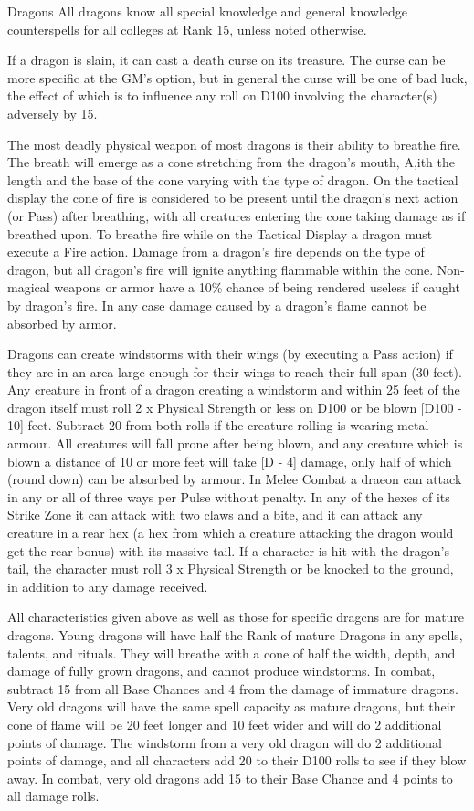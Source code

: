 \begin{mmgroup}{Dragons}
All dragons know all special knowledge and general knowledge
counterspells for all colleges at Rank 15, unless noted otherwise.

If a dragon is slain, it can cast a death curse on its treasure.  The
curse can be more specific at the GM's option, but in general the
curse will be one of bad luck, the effect of which is to influence any
roll on D100 involving the character(s) adversely by 15.

The most deadly physical weapon of most dragons is their ability to
breathe fire. The breath will emerge as a cone stretching from the
dragon's mouth, A,ith the length and the base of the cone varying with
the type of dragon.  On the tactical display the cone of fire is
considered to be present until the dragon's next action (or Pass)
after breathing, with all creatures entering the cone taking damage as
if breathed upon.  To breathe fire while on the Tactical Display a
dragon must execute a Fire action.  Damage from a dragon's fire
depends on the type of dragon, but all dragon's fire will ignite
anything flammable within the cone.  Non-magical weapons or armor have
a 10\% chance of being rendered useless if caught by dragon's fire.  In
any case damage caused by a dragon's flame cannot be absorbed by
armor.

Dragons can create windstorms with their wings (by executing a Pass
action) if they are in an area large enough for their wings to reach
their full span (30 feet).  Any creature in front of a dragon creating
a windstorm and within 25 feet of the dragon itself must roll 2 x
Physical Strength or less on D100 or be blown [D100 - 10] feet.
Subtract 20 from both rolls if the creature rolling is wearing metal
armour.  All creatures will fall prone after being blown, and any
creature which is blown a distance of 10 or more feet will take [D -
4] damage, only half of which (round down) can be absorbed by armour.
In Melee Combat a draeon can attack in any or all of three ways per
Pulse without penalty.  In any of the hexes of its Strike Zone it can
attack with two claws and a bite, and it can attack any creature in a
rear hex (a hex from which a creature attacking the dragon would get
the rear bonus) with its massive tail.  If a character is hit with the
dragon's tail, the character must roll 3 x Physical Strength or be
knocked to the ground, in addition to any damage received.

All characteristics given above as well as those for specific dragcns
are for mature dragons.  Young dragons will have half the Rank of
mature Dragons in any spells, talents, and rituals.  They will breathe
with a cone of half the width, depth, and damage of fully grown
dragons, and cannot produce windstorms.  In combat, subtract 15 from
all Base Chances and 4 from the damage of immature dragons.  Very old
dragons will have the same spell capacity as mature dragons, but their
cone of flame will be 20 feet longer and 10 feet wider and will do 2
additional points of damage.  The windstorm from a very old dragon
will do 2 additional points of damage, and all characters add 20 to
their D100 rolls to see if they blow away.  In combat, very old
dragons add 15 to their Base Chance and 4 points to all damage rolls.


\end{mmgroup}
